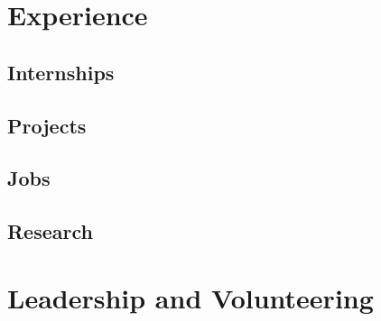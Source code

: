 \documentclass[letterpaper, 11pt]{moderncv}
\begin{document}
	\begin{resume}
		\section{Experience}
			\subsection{\textbf{Internships}}
				
			\subsection{\textbf{Projects}}
				
				
			\subsection{\textbf{Jobs}}
				
			\subsection{\textbf{Research}}
				
		\section{Leadership and Volunteering}
			
	\end{resume}
\end{document}
